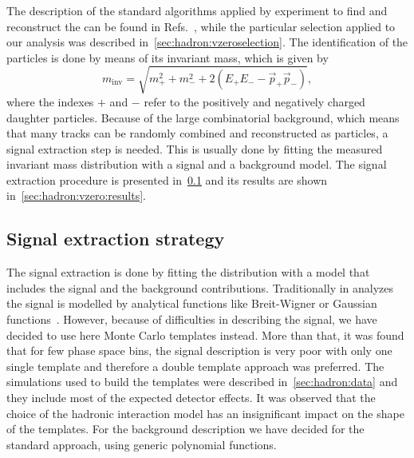 The description of the standard algorithms applied by \NASixtyOne experiment
to find and reconstruct the \vzeros can be found in
Refs.~\cite{BarnaThesis,TobiaszThesis},
while the particular \vzero selection applied to our
analysis was described in~\cref{sec:hadron:vzeroselection}.
The identification of the \vzero particles is done by means of
its invariant mass, which is given by
\begin{equation}
  m_\text{inv} = \sqrt{m_+^2 + m_-^2 + 2(E_+E_--\vec{p}_+\vec{p}_-)},
\end{equation}
where the indexes $+$ and $-$ refer to the positively
and negatively charged daughter particles.
Because of the large combinatorial background, which means that
many tracks can be randomly combined and reconstructed as \vzero
particles, a signal extraction step is needed. This is usually done
by fitting the measured invariant mass distribution with a signal
and a background model. The signal extraction procedure is presented
in~\cref{sec:hadron:vzero:signal} and its results are shown
in~\cref{sec:hadron:vzero:results}.


\subsection{Signal extraction strategy}
\label{sec:hadron:vzero:signal}


The signal extraction is done by fitting the \minv distribution
with a model that includes the signal and the background contributions.
Traditionally in \NASixtyOne analyzes the signal
is modelled by analytical functions like Breit-Wigner
or Gaussian functions~\cite{Abgrall:2015hmv,Aduszkiewicz:2015dmr}. 
However, because of difficulties in describing
the \kzeros signal, we have decided to use here
Monte Carlo templates instead. More than that, it was found
that for few \kzeros phase space bins,
the signal description is very poor
with only one single template and therefore a double template approach
was preferred.
The simulations used to build the templates were described
in~\cref{sec:hadron:data} and they include most of the expected
detector effects. It was observed that the choice of the
hadronic interaction model has an insignificant impact
on the shape of the templates.
For the background description we have decided
for the standard approach, using generic polynomial functions.



